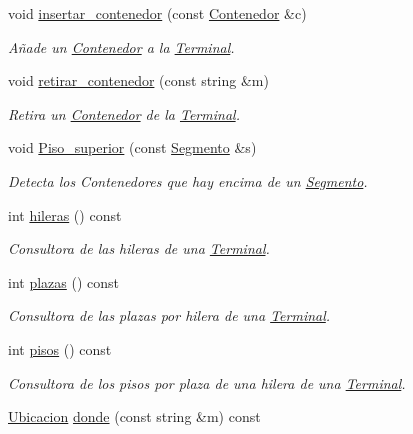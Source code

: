 \begin{DoxyCompactItemize}
void \hyperlink{class_terminal_a0448a45cc3dea91ab383c79246c9e50e}{insertar\+\_\+contenedor} (const \hyperlink{class_contenedor}{Contenedor} \&c)
\begin{DoxyCompactList}\small\item\em Añade un \hyperlink{class_contenedor}{Contenedor} a la \hyperlink{class_terminal}{Terminal}. \end{DoxyCompactList}\item 
void \hyperlink{class_terminal_a4a5b00174efb9993ead60369d206375b}{retirar\+\_\+contenedor} (const string \&m)
\begin{DoxyCompactList}\small\item\em Retira un \hyperlink{class_contenedor}{Contenedor} de la \hyperlink{class_terminal}{Terminal}. \end{DoxyCompactList}\item 
void \hyperlink{class_terminal_a122e5521bd57ee9ac07db30f5f82a346}{Piso\+\_\+superior} (const \hyperlink{class_segmento}{Segmento} \&s)
\begin{DoxyCompactList}\small\item\em Detecta los Contenedores que hay encima de un \hyperlink{class_segmento}{Segmento}. \end{DoxyCompactList}\item 
int \hyperlink{class_terminal_a6e7268ad5b0ffbf1484f1f1522e800f0}{hileras} () const
\begin{DoxyCompactList}\small\item\em Consultora de las hileras de una \hyperlink{class_terminal}{Terminal}. \end{DoxyCompactList}\item 
int \hyperlink{class_terminal_a06602e79ec9e7bca40d73d7a6c436fe3}{plazas} () const
\begin{DoxyCompactList}\small\item\em Consultora de las plazas por hilera de una \hyperlink{class_terminal}{Terminal}. \end{DoxyCompactList}\item 
int \hyperlink{class_terminal_ae6e79d13bb240d038142256552ae0ec9}{pisos} () const
\begin{DoxyCompactList}\small\item\em Consultora de los pisos por plaza de una hilera de una \hyperlink{class_terminal}{Terminal}. \end{DoxyCompactList}\item 
\hyperlink{class_ubicacion}{Ubicacion} \hyperlink{class_terminal_a2847cb58fe61bb488f089bc67a1973fe}{donde} (const string \&m) const

\end{DoxyCompactItemize}
